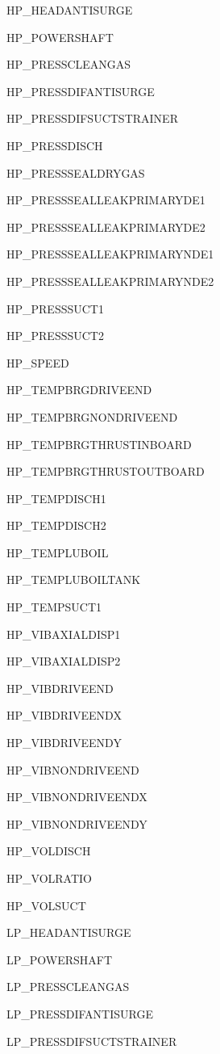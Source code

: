 \documentclass[runningheads]{llncs}
\begin{document}
\begin{multicols}{3}
\begin{enumerate}
{			\item HP\_HEADANTISURGE
			\item HP\_POWERSHAFT
			\item HP\_PRESSCLEANGAS
			\item HP\_PRESSDIFANTISURGE
			\item HP\_PRESSDIFSUCTSTRAINER
			\item HP\_PRESSDISCH
			\item HP\_PRESSSEALDRYGAS
			\item HP\_PRESSSEALLEAKPRIMARYDE1
			\item HP\_PRESSSEALLEAKPRIMARYDE2
			\item HP\_PRESSSEALLEAKPRIMARYNDE1
			\item HP\_PRESSSEALLEAKPRIMARYNDE2
			\item HP\_PRESSSUCT1
			\item HP\_PRESSSUCT2
			\item HP\_SPEED
			\item HP\_TEMPBRGDRIVEEND
			\item HP\_TEMPBRGNONDRIVEEND
			\item HP\_TEMPBRGTHRUSTINBOARD
			\item HP\_TEMPBRGTHRUSTOUTBOARD
			\item HP\_TEMPDISCH1
			\item HP\_TEMPDISCH2
			\item HP\_TEMPLUBOIL
			\item HP\_TEMPLUBOILTANK
			\item HP\_TEMPSUCT1
			\item HP\_VIBAXIALDISP1
			\item HP\_VIBAXIALDISP2
			\item HP\_VIBDRIVEEND
			\item HP\_VIBDRIVEENDX
			\item HP\_VIBDRIVEENDY
			\item HP\_VIBNONDRIVEEND
			\item HP\_VIBNONDRIVEENDX
			\item HP\_VIBNONDRIVEENDY
			\item HP\_VOLDISCH
			\item HP\_VOLRATIO
			\item HP\_VOLSUCT
			\item LP\_HEADANTISURGE
			\item LP\_POWERSHAFT
			\item LP\_PRESSCLEANGAS
			\item LP\_PRESSDIFANTISURGE
			\item LP\_PRESSDIFSUCTSTRAINER
}
\end{enumerate}
\end{multicols}
\end{document}
